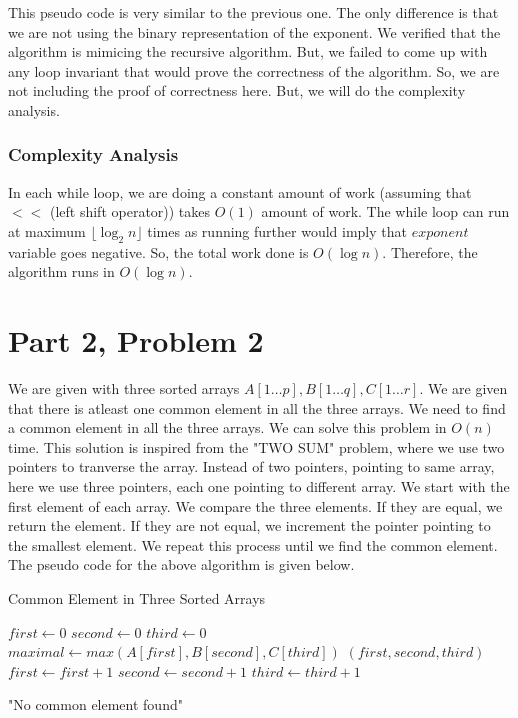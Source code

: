 \documentclass{article}
\begin{document}
This pseudo code is very similar to the previous one. The only difference is that we are not using the binary representation of the exponent. We verified that the algorithm is mimicing the recursive algorithm. But, we failed to come up with any loop invariant that would prove the correctness of the algorithm. So, we are not including the proof of correctness here. But, we will do the complexity analysis.

\subsubsection*{Complexity Analysis}
In each while loop, we are doing a constant amount of work (assuming that $<<$ (left shift operator)) takes $O(1)$ amount of work. The while loop can run at maximum $\lfloor \log_2 n \rfloor$ times as running further would imply that $exponent$ variable goes negative. So, the total work done is $O(\log n)$. Therefore, the algorithm runs in $O(\log n)$.


\section*{Part 2, Problem 2}
We are given with three sorted arrays $A[1\ldots p], B[1\ldots q], C[1\ldots r]$. We are given that there is atleast one common element in all the three arrays. We need to find a common element in all the three arrays. We can solve this problem in $O(n)$ time. This solution is inspired from the "TWO SUM" problem, where we use two pointers to tranverse the array. Instead of two pointers, pointing to same array, here we use three pointers, each one pointing to different array. We start with the first element of each array. We compare the three elements. If they are equal, we return the element. If they are not equal, we increment the pointer pointing to the smallest element. We repeat this process until we find the common element. The pseudo code for the above algorithm is given below.

\begin{algorithm}
\caption{Common Element in Three Sorted Arrays}
    \begin{algorithmic}[1]
    \State $first \gets 0$
    \State $second \gets 0$
    \State $third \gets 0$
        \State $maximal \gets max(A[first], B[second], C[third])$
            \State \Return $(first, second, third)$
        \EndIf
            \State $first \gets first + 1$
        \EndIf
            \State $second \gets second + 1$
        \EndIf
            \State $third \gets third + 1$
        \EndIf
    \EndWhile

    \Return "No common element found"
    \EndFunction
    \end{algorithmic}
\end{algorithm}
\end{document}

